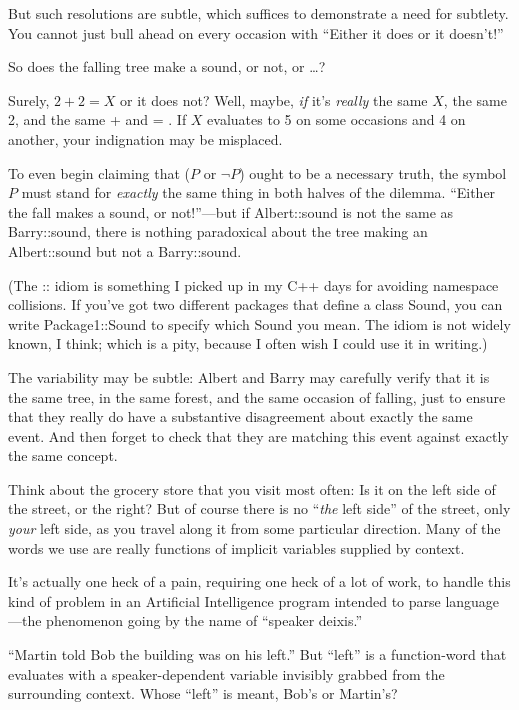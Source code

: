 {
 But such resolutions are subtle, which suffices to demonstrate a
need for subtlety. You cannot just bull ahead on every occasion with
``Either it does or it
doesn't!''}

{
 So does the falling tree make a sound, or not, or \ldots ?}

{
 Surely, $2 + 2 = X$ or it does not? Well, maybe, \textit{if}
it's \textit{really} the same $X$, the same 2, and the
same + and = . If $X$ evaluates to 5 on some occasions and 4 on another,
your indignation may be misplaced.}

{
 To even begin claiming that ($P$ or $\lnot P$) ought to be a
necessary truth, the symbol $P$ must stand for \textit{exactly} the same
thing in both halves of the dilemma. ``Either the fall
makes a sound, or not!''---but if Albert::sound is
not the same as Barry::sound, there is nothing paradoxical about the
tree making an Albert::sound but not a Barry::sound.}

{
 (The :: idiom is something I picked up in my C++ days for avoiding
namespace collisions. If you've got two different
packages that define a class Sound, you can write Package1::Sound to
specify which Sound you mean. The idiom is not widely known, I think;
which is a pity, because I often wish I could use it in writing.)}

{
 The variability may be subtle: Albert and Barry may carefully
verify that it is the same tree, in the same forest, and the same
occasion of falling, just to ensure that they really do have a
substantive disagreement about exactly the same event. And then forget
to check that they are matching this event against exactly the same
concept.}

{
 Think about the grocery store that you visit most often: Is it on
the left side of the street, or the right? But of course there is no
``\textit{the} left side'' of the
street, only \textit{your} left side, as you travel along it from some
particular direction. Many of the words we use are really functions of
implicit variables supplied by context.}

{
 It's actually one heck of a pain, requiring one
heck of a lot of work, to handle this kind of problem in an Artificial
Intelligence program intended to parse language---the phenomenon going
by the name of ``speaker deixis.''}

{
 ``Martin told Bob the building was on his
left.'' But
``left'' is a function-word that
evaluates with a speaker-dependent variable invisibly grabbed from the
surrounding context. Whose ``left''
is meant, Bob's or Martin's?}

